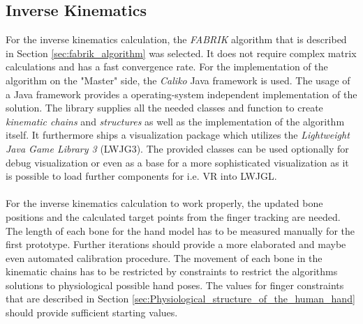 \subsection{Inverse Kinematics}
For the inverse kinematics calculation, the \textit{FABRIK} algorithm that is described in Section  \ref{sec:fabrik_algorithm} was selected. It does not require complex matrix calculations and has a fast convergence rate. For the implementation of the algorithm on the "Master" side, the \textit{Caliko} Java framework \cite{Lansley.2016} is used. The usage of a Java framework provides a operating-system independent implementation of the solution. The library supplies all the needed classes and function to create \textit{kinematic chains} and \textit{structures} as well as the implementation of the algorithm itself. It furthermore ships a visualization package which utilizes the \textit{Lightweight Java Game Library 3} (LWJG3). The provided classes can be used optionally for debug visualization or even as a base for a more sophisticated visualization as it is possible to load further components for i.e. VR into LWJGL.\\\\
For the inverse kinematics calculation to work properly, the updated bone positions and the calculated target points from the finger tracking are needed.
The length of each bone for the hand model has to be measured manually for the first prototype. Further iterations should provide a more elaborated and maybe even automated calibration procedure. The movement of each bone in the kinematic chains has to be restricted by constraints to restrict the algorithms solutions to physiological possible hand poses. The values for finger constraints that are described in Section \ref{sec:Physiological_structure_of_the_human_hand} should provide sufficient starting values. 
